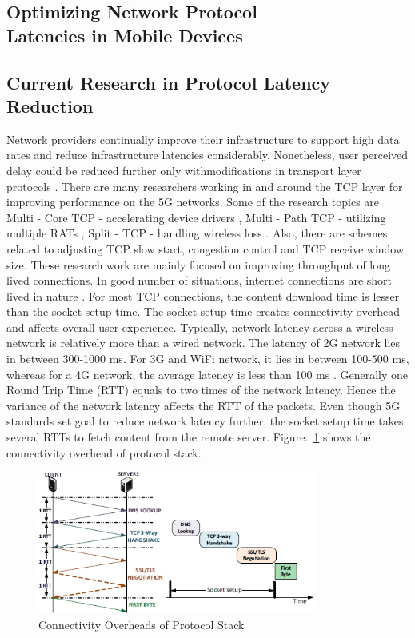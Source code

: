 \begin{multicols}{2}
\section{Optimizing Network Protocol\\ Latencies in Mobile Devices}

\subsection{Current Research in Protocol Latency Reduction}

Network providers continually improve their infrastructure to support high data rates and reduce infrastructure latencies considerably. Nonetheless, user perceived delay could be reduced further only with\break modifications in transport layer protocols \cite{art1-key07}. There are many researchers working in and around the TCP layer for improving performance on the 5G networks. Some of the research topics are Multi - Core TCP - accelerating device drivers \cite{art1-key08}, Multi - Path TCP - utilizing multiple RATs \cite{art1-key09}, Split - TCP - handling wireless loss \cite{art1-key10}. Also, there are schemes related to adjusting TCP slow start, congestion control and TCP receive window size. These research work are mainly focused on improving throughput of long lived connections. In good number of situations, internet connections are short lived in nature \cite{art1-key11}. For most TCP connections, the content download time is lesser than the socket setup time. The socket setup time creates connectivity overhead and affects overall user experience. Typically, network latency across a wireless network is relatively more than a wired network. The latency of 2G network lies in between 300-1000 ms. For 3G and WiFi network, it lies in between 100-500 ms, whereas for a 4G network, the average latency is less than 100 ms \cite{art1-key12}. Generally one Round Trip Time (RTT) equals to two times of the network latency. Hence the variance of the network latency affects the RTT of the packets. Even though 5G standards set goal to reduce network latency further, the socket setup time takes several RTTs to fetch content from the remote server. Figure.~\ref{chap1-fig04} shows the connectivity overhead of protocol stack.

\begin{figure}[H]
\centering
\includegraphics[scale=2.9]{src/Figures/chap1/chap1-fig04.jpg}
\caption{Connectivity Overheads of Protocol Stack}\label{chap1-fig04}
\end{figure}


\end{multicols}
